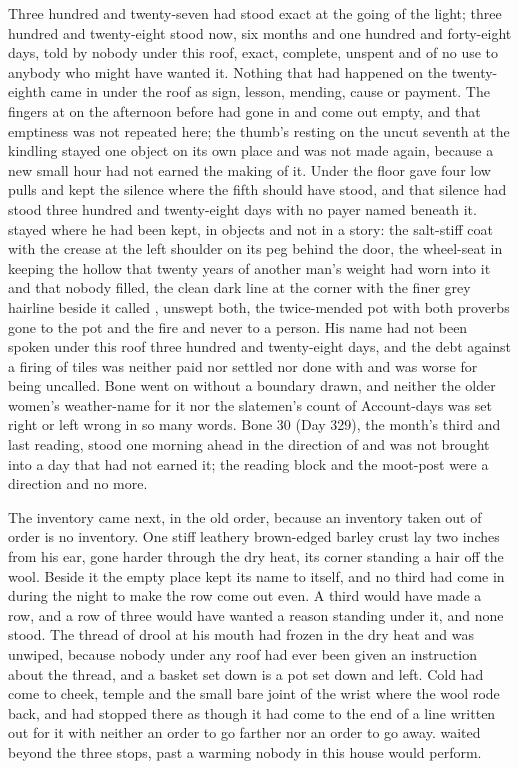 Three hundred and twenty-seven had stood exact at the going of the light; three hundred and twenty-eight stood now, six months and one hundred and forty-eight days, told by nobody under this roof, exact, complete, unspent and of no use to anybody who might have wanted it. Nothing that had happened on the twenty-eighth came in under the roof as sign, lesson, mending, cause or payment. The fingers at  on the afternoon before had gone in and come out empty, and that emptiness was not repeated here; the thumb's resting on the uncut seventh at the kindling stayed one object on its own place and was not made again, because a new small hour had not earned the making of it. Under the floor  gave four low pulls and kept the silence where the fifth should have stood, and that silence had stood three hundred and twenty-eight days with no payer named beneath it.  stayed where he had been kept, in objects and not in a story: the salt-stiff coat with the crease at the left shoulder on its peg behind the door, the wheel-seat in  keeping the hollow that twenty years of another man's weight had worn into it and that nobody filled, the clean dark line at the corner with the finer grey hairline beside it called , unswept both, the twice-mended pot with both proverbs gone to the pot and the fire and never to a person. His name had not been spoken under this roof three hundred and twenty-eight days, and the debt against a firing of tiles was neither paid nor settled nor done with and was worse for being uncalled. Bone went on without a boundary drawn, and neither the older women's weather-name for it nor the slatemen's count of Account-days was set right or left wrong in so many words. Bone 30 (Day 329), the month's third and last reading, stood one morning ahead in the direction of  and was not brought into a day that had not earned it; the reading block and the moot-post were a direction and no more.

The inventory came next, in the old order, because an inventory taken out of order is no inventory. One stiff leathery brown-edged barley crust lay two inches from his ear, gone harder through the dry heat, its corner standing a hair off the wool. Beside it the empty place kept its name to itself, and no third had come in during the night to make the row come out even. A third would have made a row, and a row of three would have wanted a reason standing under it, and none stood. The thread of drool at his mouth had frozen in the dry heat and was unwiped, because nobody under any roof had ever been given an instruction about the thread, and a basket set down is a pot set down and left. Cold had come to cheek, temple and the small bare joint of the wrist where the wool rode back, and had stopped there as though it had come to the end of a line written out for it with neither an order to go farther nor an order to go away.  waited beyond the three stops, past a warming nobody in this house would perform.

